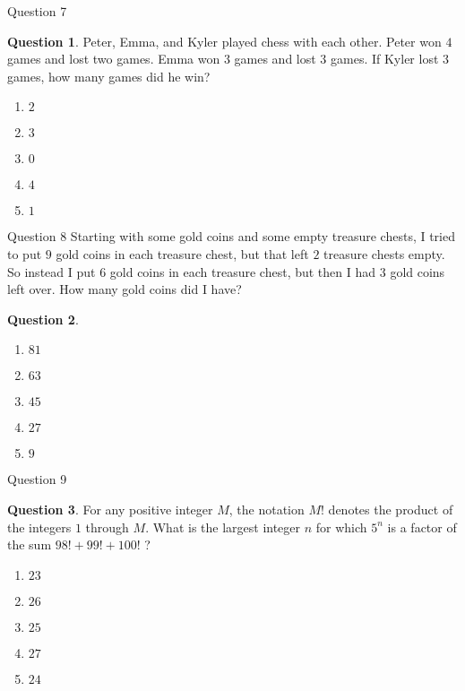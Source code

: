 \documentclass[handout]{beamer}
\theoremstyle{definition}
\newtheorem{quest}{Question}
\begin{document}
\begin{frame}{Question 7}
\begin{quest}
Peter, Emma, and Kyler played chess with each other.
Peter won $4$ games and lost two games.
Emma won $3$ games and lost $3$ games.
If Kyler lost $3$ games, how many games did he win?
\begin{enumerate}[a]
\item $2$
\item $3$
\item $0$
\item $4$
\item $1$
\end{enumerate}
\end{quest}

\end{frame}

\begin{frame}{Question 8}
Starting with some gold coins and some empty treasure chests, I tried to put $9$ gold coins in each treasure chest, but that left $2$ treasure chests empty.
So instead I put $6$ gold coins in each treasure chest, but then I had $3$ gold coins left over.  How many gold coins did I have?
\begin{quest}
\begin{enumerate}[a]
\item $81$
\item $63$
\item $45$
\item $27$
\item $9$
\end{enumerate}
\end{quest}

\end{frame}

\begin{frame}{Question 9}
\begin{quest}
For any positive integer $M$, the notation $M!$ denotes the product of the integers $1$ through $M$.  What is the largest integer $n$ for which $5^n$ is a factor of the sum $98! + 99! + 100!$ ?
\begin{enumerate}[a]
\item $23$
\item $26$
\item $25$
\item $27$
\item $24$
\end{enumerate}
\end{quest}

\end{frame}
\end{document}
